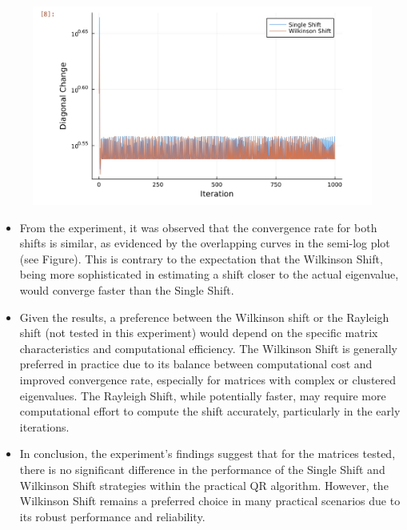 \documentclass{article}
\begin{document}
\begin{figure}[H]
    \centering
    \includegraphics[width=0.75\linewidth]{Image 4-8-24 at 00.30 (2).jpeg}
\end{figure}
\begin{itemize}
    \item From the experiment, it was observed that the convergence rate for both shifts is similar, as evidenced by the overlapping curves in the semi-log plot (see Figure). This is contrary to the expectation that the Wilkinson Shift, being more sophisticated in estimating a shift closer to the actual eigenvalue, would converge faster than the Single Shift.

\item Given the results, a preference between the Wilkinson shift or the Rayleigh shift (not tested in this experiment) would depend on the specific matrix characteristics and computational efficiency. The Wilkinson Shift is generally preferred in practice due to its balance between computational cost and improved convergence rate, especially for matrices with complex or clustered eigenvalues. The Rayleigh Shift, while potentially faster, may require more computational effort to compute the shift accurately, particularly in the early iterations.

\item In conclusion, the experiment's findings suggest that for the matrices tested, there is no significant difference in the performance of the Single Shift and Wilkinson Shift strategies within the practical QR algorithm. However, the Wilkinson Shift remains a preferred choice in many practical scenarios due to its robust performance and reliability.
\end{itemize}
\end{document}
